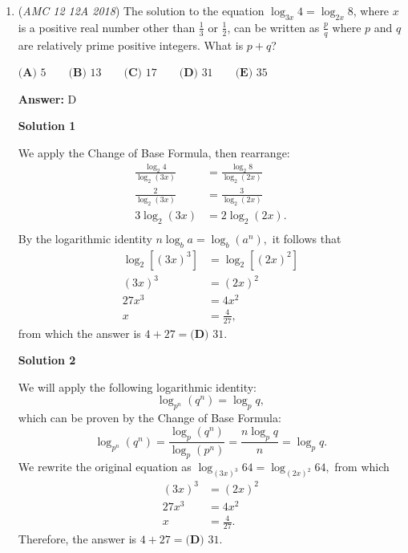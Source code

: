 \begin{enumerate}
 



\textbf{Solution 14( , DON'T USE IN ACTUAL MATH COMP)}

There are $3^8$ choices which equals $6561$ and just by intuition kind of, we divide that by two and surprisingly, it equals $3280.5$ and the closes answer choice is $\boxed{\textbf{(D) }3281}$.

 Methods used:

 by Iris

 Edit by TheCalcGuy: this is similar to solution 10, but just a $\textit{tiny}$ bit (a lot) more risky.

 


	\item (\textit{AMC 12 12A 2018}) The solution to the equation $\log_{3x} 4 = \log_{2x} 8$, where $x$ is a positive real number other than $\frac{1}{3}$ or $\frac{1}{2}$, can be written as $\frac {p}{q}$ where $p$ and $q$ are relatively prime positive integers. What is $p + q$?


 $\textbf{(A) } 5   \qquad     \textbf{(B) } 13   \qquad     \textbf{(C) } 17   \qquad    \textbf{(D) } 31 \qquad   \textbf{(E) } 35$

 \textbf{Answer: }D



\textbf{Solution 1}

We apply the Change of Base Formula, then rearrange:
 \begin{align*} \frac{\log_2{4}}{\log_2{(3x)}}&=\frac{\log_2{8}}{\log_2{(2x)}} \\ \frac{2}{\log_2{(3x)}}&=\frac{3}{\log_2{(2x)}} \\ 3\log_2{(3x)}&=2\log_2{(2x)}. \\ \end{align*}
By the logarithmic identity $n\log_b{a}=\log_b{\left(a^n\right)},$ it follows that
 \begin{align*} \log_2{\left[(3x)^3\right]}&=\log_2{\left[(2x)^2\right]} \\ (3x)^3&=(2x)^2 \\ 27x^3&=4x^2 \\ x&=\frac{4}{27}, \end{align*}
from which the answer is $4+27=\boxed{\textbf{(D) } 31}.$




\textbf{Solution 2}

We will apply the following logarithmic identity:
 \[\log_{p^n}{\left(q^n\right)}=\log_{p}{q},\]which can be proven by the Change of Base Formula: 
 \[\log_{p^n}{\left(q^n\right)}=\frac{\log_{p}{\left(q^n\right)}}{\log_{p}{\left(p^n\right)}}=\frac{n\log_{p}{q}}{n}=\log_{p}{q}.\]We rewrite the original equation as $\log_{(3x)^3} 64 = \log_{(2x)^2} 64,$ from which
 \begin{align*} (3x)^3&=(2x)^2 \\ 27x^3&=4x^2 \\ x&=\frac{4}{27}. \end{align*}
Therefore, the answer is $4+27=\boxed{\textbf{(D) } 31}.$





\end{enumerate}
